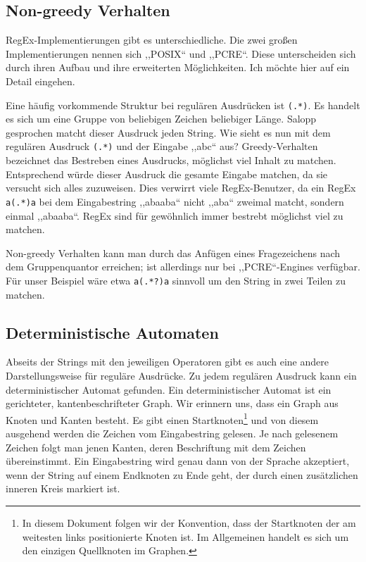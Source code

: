 \subsection{Non-greedy Verhalten}
%
RegEx-Implementierungen gibt es unterschiedliche. Die zwei großen Implementierungen nennen sich ,,POSIX`` und ,,PCRE``. Diese unterscheiden sich durch ihren Aufbau und ihre erweiterten Möglichkeiten. Ich möchte hier auf ein Detail eingehen.

Eine häufig vorkommende Struktur bei regulären Ausdrücken ist \texttt{(.*)}. Es handelt es sich um eine Gruppe von beliebigen Zeichen beliebiger Länge. Salopp gesprochen matcht dieser Ausdruck jeden String.
Wie sieht es nun mit dem regulären Ausdruck \texttt{(.*)} und der Eingabe ,,abc`` aus? Greedy-Verhalten bezeichnet das Bestreben eines Ausdrucks, möglichst viel Inhalt zu matchen. Entsprechend würde dieser Ausdruck die gesamte Eingabe matchen, da sie versucht sich alles zuzuweisen. Dies verwirrt viele RegEx-Benutzer, da ein RegEx \texttt{a(.*)a} bei dem Eingabestring ,,abaaba`` nicht ,,aba`` zweimal matcht, sondern einmal ,,abaaba``. RegEx sind für gewöhnlich immer bestrebt möglichst viel zu matchen.

Non-greedy Verhalten kann man durch das Anfügen eines Fragezeichens nach dem Gruppenquantor erreichen; ist allerdings nur bei ,,PCRE``-Engines verfügbar. Für unser Beispiel wäre etwa \texttt{a(.*?)a} sinnvoll um den String in zwei Teilen zu matchen.

\subsection{Deterministische Automaten}
%
Abseits der Strings mit den jeweiligen Operatoren gibt es auch eine andere Darstellungsweise für reguläre Ausdrücke. Zu jedem regulären Ausdruck kann ein deterministischer Automat gefunden. Ein deterministischer Automat ist ein gerichteter, kantenbeschrifteter Graph. Wir erinnern uns, dass ein Graph aus Knoten und Kanten besteht. Es gibt einen Startknoten\footnote{In diesem Dokument folgen wir der Konvention, dass der Startknoten der am weitesten links positionierte Knoten ist. Im Allgemeinen handelt es sich um den einzigen Quellknoten im Graphen.} und von diesem ausgehend werden die Zeichen vom Eingabestring gelesen. Je nach gelesenem Zeichen folgt man jenen Kanten, deren Beschriftung mit dem Zeichen übereinstimmt. Ein Eingabestring wird genau dann von der Sprache akzeptiert, wenn der String auf einem Endknoten zu Ende geht, der durch einen zusätzlichen inneren Kreis markiert ist.

